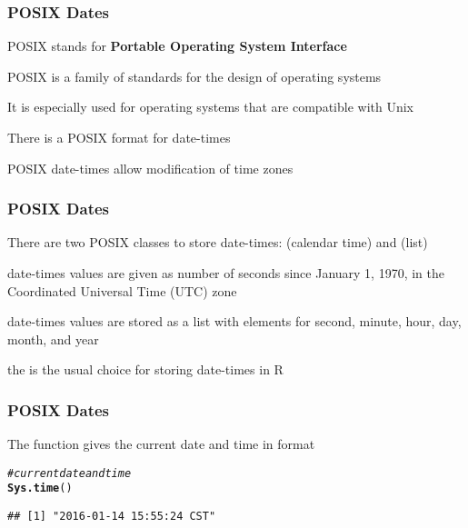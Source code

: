 \documentclass[12pt]{beamer}\usepackage[]{graphicx}\usepackage[]{color}
\makeatletter
\newcommand{\hlcom}[1]{\textcolor[rgb]{0.678,0.584,0.686}{\textit{#1}}}%
\newcommand{\hlstd}[1]{\textcolor[rgb]{0.345,0.345,0.345}{#1}}%
\newcommand{\hlkwd}[1]{\textcolor[rgb]{0.737,0.353,0.396}{\textbf{#1}}}%
\newenvironment{kframe}{%
 \def\at@end@of@kframe{}%
 \ifinner\ifhmode%
  \def\at@end@of@kframe{\end{minipage}}%
  \begin{minipage}{\columnwidth}%
 \fi\fi%
 \def\FrameCommand##1{\hskip\@totalleftmargin \hskip-\fboxsep
 \colorbox{shadecolor}{##1}\hskip-\fboxsep
     \hskip-\linewidth \hskip-\@totalleftmargin \hskip\columnwidth}%
 \MakeFramed {\advance\hsize-\width
   \@totalleftmargin\z@ \linewidth\hsize
   \@setminipage}}%
 {\par\unskip\endMakeFramed%
 \at@end@of@kframe}
\newenvironment{knitrout}{}{} %
\makeatother
\begin{document}

\begin{frame}
\frametitle{POSIX Dates}

\bi
  \item POSIX stands for \textbf{Portable Operating System Interface}
  \item POSIX is a family of standards for the design of operating systems
  \item It is especially used for operating systems that are compatible with Unix
  \item There is a POSIX format for date-times
  \item POSIX date-times allow modification of time zones
\ei

\end{frame}


\begin{frame}
\frametitle{POSIX Dates}

\bi
  \item There are two POSIX classes to store date-times:  (calendar time) and  (list)
  \item {} date-times values are given as number of seconds since January 1, 1970, in the Coordinated Universal Time (UTC) zone
  \item {} date-times values are stored as a list with elements for second, minute, hour, day, month, and year
  \item the  is the usual choice for storing date-times in R
\ei

\end{frame}


\begin{frame}[fragile]
\frametitle{POSIX Dates}

The function  gives the current date and time in  format
\begin{knitrout}\footnotesize
{}\color{fgcolor}\begin{kframe}
\begin{alltt}
\hlcom{# current date and time}
\hlkwd{Sys.time}\hlstd{()}
\end{alltt}
\begin{verbatim}
## [1] "2016-01-14 15:55:24 CST"
\end{verbatim}
\end{kframe}
\end{knitrout}

\end{frame}
\end{document}
